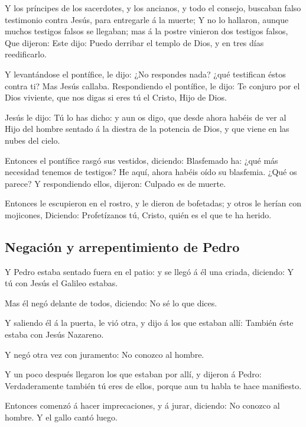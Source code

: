  Y los príncipes de los sacerdotes, y los ancianos, y todo
el consejo, buscaban falso testimonio contra Jesús, para entregarle á la
muerte;  Y no lo hallaron, aunque muchos testigos falsos se
llegaban; mas á la postre vinieron dos testigos falsos, 
Que dijeron: Este dijo: Puedo derribar el templo de Dios, y en tres días
reedificarlo.

 Y levantándose el pontífice, le dijo: ¿No respondes nada?
¿qué testifican éstos contra ti?  Mas Jesús callaba.
Respondiendo el pontífice, le dijo: Te conjuro por el Dios viviente, que
nos digas si eres tú el Cristo, Hijo de Dios.

 Jesús le dijo: Tú lo has dicho: y aun os digo, que desde
ahora habéis de ver al Hijo del hombre sentado á la diestra de la
potencia de Dios, y que viene en las nubes del cielo.

 Entonces el pontífice rasgó sus vestidos, diciendo:
Blasfemado ha: ¿qué más necesidad tenemos de testigos? He aquí, ahora
habéis oído su blasfemia.  ¿Qué os parece? Y respondiendo
ellos, dijeron: Culpado es de muerte.

 Entonces le escupieron en el rostro, y le dieron de
bofetadas; y otros le herían con mojicones,  Diciendo:
Profetízanos tú, Cristo, quién es el que te ha herido.

\hypertarget{negaciuxf3n-y-arrepentimiento-de-pedro}{%
\subsection{Negación y arrepentimiento de
Pedro}\label{negaciuxf3n-y-arrepentimiento-de-pedro}}

 Y Pedro estaba sentado fuera en el patio: y se llegó á él
una criada, diciendo: Y tú con Jesús el Galileo estabas.

 Mas él negó delante de todos, diciendo: No sé lo que
dices.

 Y saliendo él á la puerta, le vió otra, y dijo á los que
estaban allí: También éste estaba con Jesús Nazareno.

 Y negó otra vez con juramento: No conozco al hombre.

 Y un poco después llegaron los que estaban por allí, y
dijeron á Pedro: Verdaderamente también tú eres de ellos, porque aun tu
habla te hace manifiesto.

 Entonces comenzó á hacer imprecaciones, y á jurar,
diciendo: No conozco al hombre. Y el gallo cantó luego.

